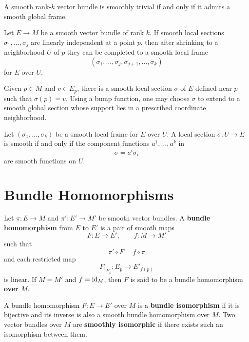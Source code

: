 \documentclass[12pt, oneside]{book}
\begin{document}
\begin{corollary}
    A smooth rank-$k$ vector bundle is smoothly trivial if and only if it admits a smooth global frame.
\end{corollary}

\begin{proposition}
    Let $E\rightarrow M$ be a smooth vector bundle of rank $k$. If smooth local sections $\sigma_1,\ldots,\sigma_j$ are linearly independent at a point $p$, then after shrinking to a neighborhood $U$ of $p$ they can be completed to a smooth local frame
    \[
        (\sigma_1,\ldots,\sigma_j,\sigma_{j+1},\ldots,\sigma_k)
    \]
    for $E$ over $U$.
\end{proposition}

\begin{corollary}
    Given $p\in M$ and $v\in E_p$, there is a smooth local section $\sigma$ of $E$ defined near $p$ such that $\sigma(p)=v$. Using a bump function, one may choose $\sigma$ to extend to a smooth global section whose support lies in a prescribed coordinate neighborhood.
\end{corollary}

\begin{proposition}
    Let $(\sigma_1,\ldots,\sigma_k)$ be a smooth local frame for $E$ over $U$. A local section $\sigma:U\rightarrow E$ is smooth if and only if the component functions $a^1,\ldots,a^k$ in
    \[
        \sigma=a^i\sigma_i
    \]
    are smooth functions on $U$.
\end{proposition}

\section{Bundle Homomorphisms}

\begin{definition}
    Let $\pi:E\rightarrow M$ and $\pi':E'\rightarrow M'$ be smooth vector bundles. A \textbf{bundle homomorphism} from $E$ to $E'$ is a pair of smooth maps
    \[
        F:E\rightarrow E',
        \qquad
        f:M\rightarrow M'
    \]
    such that
    \[
        \pi'\circ F=f\circ\pi
    \]
    and each restricted map
    \[
        F|_{E_p}:E_p\rightarrow E'_{f(p)}
    \]
    is linear. If $M=M'$ and $f=\operatorname{\operatorname{id}}_M$, then $F$ is said to be a bundle homomorphism \textbf{over $M$}.
\end{definition}

\begin{definition}
    A bundle homomorphism $F:E\rightarrow E'$ over $M$ is a \textbf{bundle isomorphism} if it is bijective and its inverse is also a smooth bundle homomorphism over $M$. Two vector bundles over $M$ are \textbf{smoothly isomorphic} if there exists such an isomorphism between them.
\end{definition}
\end{document}
